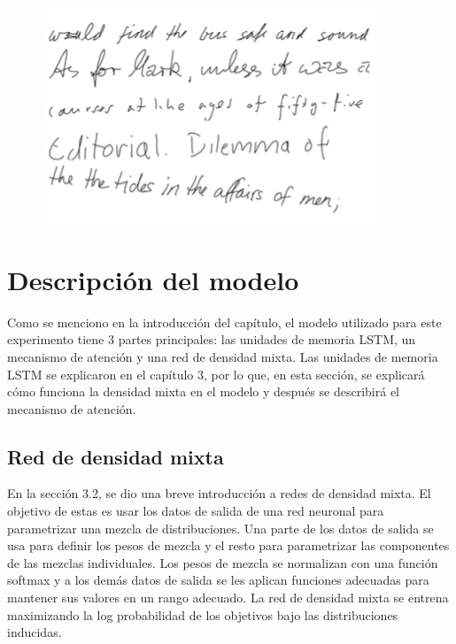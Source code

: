 \begin{figure}[h]
\begin{center}
\includegraphics{./imag/iam.png}
\end{center}
\caption{}
\end{figure}

\section{Descripción del modelo}
Como se menciono en la introducción del capítulo, el modelo utilizado para este experimento tiene 3 partes principales: las unidades de memoria LSTM, un mecanismo de atención y una red de densidad mixta. Las unidades de memoria LSTM se explicaron en el capítulo 3, por lo que, en esta sección, se explicará cómo funciona la densidad mixta en el modelo y después se describirá el mecanismo de atención. 

\subsection{Red de densidad mixta}
En la sección 3.2, se dio una breve introducción a redes de densidad mixta. El objetivo de estas es usar los datos de salida de una red neuronal para parametrizar una mezcla de distribuciones. Una parte de los datos de salida se usa para definir los pesos de mezcla y el resto para parametrizar las componentes de las mezclas individuales. Los pesos de mezcla se normalizan con una función softmax y a los demás datos de salida se les aplican funciones adecuadas para mantener sus valores en un rango adecuado. La red de densidad mixta se entrena maximizando la log probabilidad de los objetivos bajo las distribuciones inducidas.
\cite{DBLP:journals/corr/Graves13}

\vspace{1em}

